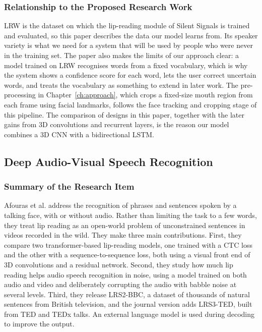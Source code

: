 \documentclass{FastFyp}
\begin{document}
\subsubsection*{Relationship to the Proposed Research Work}
LRW is the dataset on which the lip-reading module of Silent Signals is trained and evaluated, so this paper describes the data our model learns from. Its speaker variety is what we need for a system that will be used by people who were never in the training set. The paper also makes the limits of our approach clear: a model trained on LRW recognises words from a fixed vocabulary, which is why the system shows a confidence score for each word, lets the user correct uncertain words, and treats the vocabulary as something to extend in later work. The pre-processing in Chapter~\ref{ch:approach}, which crops a fixed-size mouth region from each frame using facial landmarks, follows the face tracking and cropping stage of this pipeline. The comparison of designs in this paper, together with the later gains from 3D convolutions and recurrent layers, is the reason our model combines a 3D CNN with a bidirectional LSTM.

\subsection{Deep Audio-Visual Speech Recognition}
\subsubsection*{Summary of the Research Item}
Afouras et al. \cite{ref:Afouras:2018} address the recognition of phrases and sentences spoken by a talking face, with or without audio. Rather than limiting the task to a few words, they treat lip reading as an open-world problem of unconstrained sentences in videos recorded in the wild. They make three main contributions. First, they compare two transformer-based lip-reading models, one trained with a CTC loss and the other with a sequence-to-sequence loss, both using a visual front end of 3D convolutions and a residual network. Second, they study how much lip reading helps audio speech recognition in noise, using a model trained on both audio and video and deliberately corrupting the audio with babble noise at several levels. Third, they release LRS2-BBC, a dataset of thousands of natural sentences from British television, and the journal version adds LRS3-TED, built from TED and TEDx talks. An external language model is used during decoding to improve the output.
\end{document}
